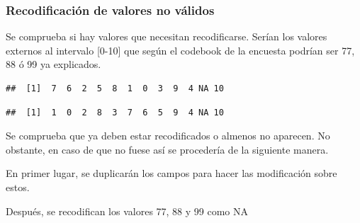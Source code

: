 \documentclass[
  12 pt,
  a4paper,
]{article}
\newenvironment{Shaded}{\begin{snugshade}}{\end{snugshade}}
\newcommand{\FunctionTok}[1]{\textcolor[rgb]{0.13,0.29,0.53}{\textbf{#1}}}
\newcommand{\NormalTok}[1]{#1}
\newcommand{\OtherTok}[1]{\textcolor[rgb]{0.56,0.35,0.01}{#1}}
\newcommand{\SpecialCharTok}[1]{\textcolor[rgb]{0.81,0.36,0.00}{\textbf{#1}}}
\begin{document}
\subsubsection{Recodificación de valores no
válidos}\label{recodificaciuxf3n-de-valores-no-vuxe1lidos}

Se comprueba si hay valores que necesitan recodificarse. Serían los
valores externos al intervalo {[}0-10{]} que según el codebook de la
encuesta podrían ser 77, 88 ó 99 ya explicados.

\begin{Shaded}
\end{Shaded}

\begin{verbatim}
##  [1]  7  6  2  5  8  1  0  3  9  4 NA 10
\end{verbatim}

\begin{Shaded}
\end{Shaded}

\begin{verbatim}
##  [1]  1  0  2  8  3  7  6  5  9  4 NA 10
\end{verbatim}

Se comprueba que ya deben estar recodificados o almenos no aparecen. No
obstante, en caso de que no fuese así se procedería de la siguiente
manera.

En primer lugar, se duplicarán los campos para hacer las modificación
sobre estos.

\begin{Shaded}
\end{Shaded}

Después, se recodifican los valores 77, 88 y 99 como NA
\end{document}
